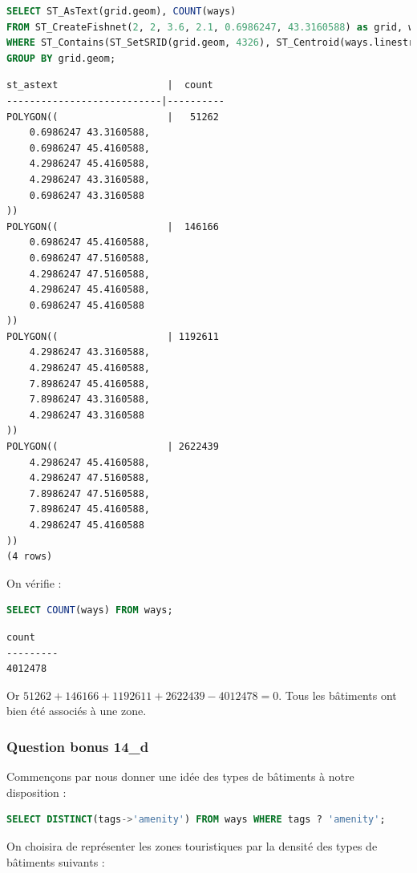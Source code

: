 \documentclass[12pt,a4paper]{article}
\begin{document}
\begin{lstlisting}[language=SQL]
SELECT ST_AsText(grid.geom), COUNT(ways)
FROM ST_CreateFishnet(2, 2, 3.6, 2.1, 0.6986247, 43.3160588) as grid, ways
WHERE ST_Contains(ST_SetSRID(grid.geom, 4326), ST_Centroid(ways.linestring))
GROUP BY grid.geom;
\end{lstlisting}

\begin{lstlisting}
st_astext                   |  count  
---------------------------|----------
POLYGON((                   |   51262
    0.6986247 43.3160588,
    0.6986247 45.4160588,
    4.2986247 45.4160588,
    4.2986247 43.3160588,
    0.6986247 43.3160588
))
POLYGON((                   |  146166
    0.6986247 45.4160588,
    0.6986247 47.5160588,
    4.2986247 47.5160588,
    4.2986247 45.4160588,
    0.6986247 45.4160588
))
POLYGON((                   | 1192611
    4.2986247 43.3160588,
    4.2986247 45.4160588,
    7.8986247 45.4160588,
    7.8986247 43.3160588,
    4.2986247 43.3160588
))
POLYGON((                   | 2622439
    4.2986247 45.4160588,
    4.2986247 47.5160588,
    7.8986247 47.5160588,
    7.8986247 45.4160588,
    4.2986247 45.4160588
))
(4 rows)
\end{lstlisting}

On vérifie :

\begin{lstlisting}[language=SQL]
SELECT COUNT(ways) FROM ways;
\end{lstlisting}

\begin{lstlisting}
count  
---------
4012478
\end{lstlisting}

Or $51262 + 146166 + 1192611 + 2622439 - 4012478 = 0$. Tous les bâtiments ont
bien été associés à une zone.

\subsubsection*{Question bonus 14\_d}

Commençons par nous donner une idée des types de bâtiments à notre disposition :

\begin{lstlisting}[language=SQL]
SELECT DISTINCT(tags->'amenity') FROM ways WHERE tags ? 'amenity';
\end{lstlisting}

On choisira de représenter les zones touristiques par la densité des types de
bâtiments suivants :
\end{document}

